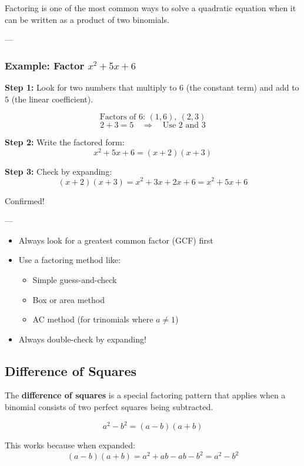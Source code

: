 \documentclass[11pt]{article}
\begin{document}
Factoring is one of the most common ways to solve a quadratic equation when it can be written as a product of two binomials.

---

\subsubsection*{Example: Factor \( x^2 + 5x + 6 \)}

\textbf{Step 1:} Look for two numbers that multiply to \( 6 \) (the constant term) and add to \( 5 \) (the linear coefficient).

\[
\text{Factors of 6: } (1,6),\ (2,3)
\]
\[
2 + 3 = 5 \quad \Rightarrow \quad \text{Use } 2 \text{ and } 3
\]

\textbf{Step 2:} Write the factored form:
\[
x^2 + 5x + 6 = (x + 2)(x + 3)
\]

\textbf{Step 3:} Check by expanding:
\[
(x + 2)(x + 3) = x^2 + 3x + 2x + 6 = x^2 + 5x + 6
\]

\checkmark Confirmed!

---

\begin{tcolorbox}[title=Factoring Tips, colback=green!5!white, colframe=green!70!black]
\begin{itemize}
  \item Always look for a greatest common factor (GCF) first
  \item Use a factoring method like:
  \begin{itemize}
    \item Simple guess-and-check
    \item Box or area method
    \item AC method (for trinomials where \( a \ne 1 \))
  \end{itemize}
  \item Always double-check by expanding!
\end{itemize}
\end{tcolorbox}
\subsection{Difference of Squares}

The \textbf{difference of squares} is a special factoring pattern that applies when a binomial consists of two perfect squares being subtracted.

\[
a^2 - b^2 = (a - b)(a + b)
\]

This works because when expanded:
\[
(a - b)(a + b) = a^2 + ab - ab - b^2 = a^2 - b^2
\]
\end{document}

